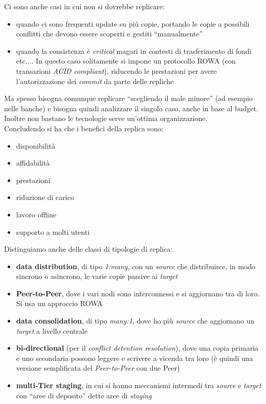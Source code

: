 \documentclass[a4paper,12pt, oneside]{book}
\begin{document}
Ci sono anche casi in cui non si dovrebbe replicare:
\begin{itemize}
  \item quando ci sono frequenti update su più copie, portando le copie a
  possibili conflitti che devono essere scoperti e gestiti ``manualmente'' 
  \item quando la consistenza è \textit{critical} magari in contesti di
  trasferimento di fondi etc$\ldots$. In questo caso solitamente si impone un
  protocollo ROWA (con transazioni \textit{ACID compliant}), riducendo le
  prestazioni per avere l'autorizzazione dei \textit{commit} da parte delle
  repliche 
\end{itemize}
Ma spesso bisogna comunque replicare ``scegliendo il male minore'' (ad esempio
nelle banche) e bisogna quindi analizzare il singolo caso, anche in base al
budget. Inoltre non bastano le tecnologie serve un'ottima organizzazione.\\ 
Concludendo si ha che i benefici della replica sono:
\begin{itemize}
  \item disponibilità
  \item affidabilità
  \item prestazioni
  \item riduzione di carico
  \item lavoro offline
  \item supporto a molti utenti
\end{itemize}
Distinguiamo anche delle classi di tipologie di replica:
\begin{itemize}
  \item \textbf{data distribution}, di tipo \textit{1:many}, con un
  \textit{source} che distribuisce, in modo sincrono o asincrono, le varie copie
  passive ai \textit{target}
  \item \textbf{Peer-to-Peer}, dove i vari nodi sono interconnessi e si
  aggiornano tra di loro. Si usa un approccio ROWA
  \item \textbf{data consolidation}, di tipo \textit{many:1}, dove ho più
  \textit{source} che aggiornano un \textit{target} a livello centrale
  \item \textbf{bi-directional} (per il \textit{conflict detention resolution}),
  dove una copia primaria e uno secondaria 
  possono leggere e scrivere a vicenda tra loro (è quindi una versione
  semplificata del \textit{Peer-to-Peer} con due Peer)
  \item \textbf{multi-Tier staging}, in cui si hanno meccanismi intermedi tra
  \textit{source} e \textit{target} con ``aree di deposito'' dette aree di
  \textit{staging}
\end{itemize}
\end{document}
